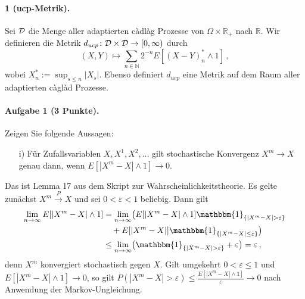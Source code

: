 \documentclass{article}
\begin{document}
\paragraph{ 1 (ucp-Metrik).}
Sei ${\cal D}$ die Menge aller adaptierten càdlàg Prozesse von $\Omega\times\mathbb{R}_+$ nach $\mathbb{R}$.
Wir definieren die Metrik $d_{ucp}\colon {\cal D}\times {\cal D}\to[0,\infty)$ durch
\begin{equation}
(X,Y)\mapsto \sum_{n\in\mathbb{N}}2^{-n}E[(X-Y)^*_n\wedge 1]\,,
\end{equation}
wobei $X^*_n:=\sup_{s\leq n}|X_s|$.
Ebenso definiert $d_{ucp}$ eine Metrik auf dem Raum aller adaptierten càglàd Prozesse.

\paragraph{Aufgabe 1 \textnormal{(3 Punkte)}.}
Zeigen Sie folgende Aussagen:
\begin{enumerate}
\item [i)] Für Zufallsvariablen $X,X^1,X^2,\dots$ gilt stochastische Konvergenz $X^m\to X$ genau dann, wenn $E[|X^m-X|\wedge 1]\rightarrow0$.
\end{enumerate}
Das ist Lemma 17 aus dem Skript zur Wahrscheinlichkeitstheorie.
Es gelte zunächst $X^m\xrightarrow{P}X$ und sei $0<\varepsilon<1$ beliebig.
Dann gilt
\begin{align*}
  \lim_{n\to\infty}E[|X^m-X|\wedge1]
  &=\lim_{n\to\infty}\bigl(E[|X^m-X|\wedge1]\mathbbm{1}_{\{|X^m-X|>\varepsilon\}}\\
  &\quad+E[|X^m-X|]\mathbbm{1}_{\{|X^m-X|\leq\varepsilon\}}\bigr)\\
  &\leq\lim_{n\to\infty}\bigl(\mathbbm{1}_{\{|X^m-X|>\varepsilon\}}+\varepsilon\bigr)=\varepsilon\,,
\end{align*}
denn $X^m$ konvergiert stochastisch gegen $X$.
Gilt umgekehrt $0<\varepsilon\leq 1$ und $E[|X^m-X|\wedge 1]\to0$, so gilt $P(|X^m-X|>\varepsilon)\leq\frac{E[|X^m-X|\wedge1]}{\varepsilon}\to0$ nach Anwendung der Markov-Ungleichung.
\end{document}
